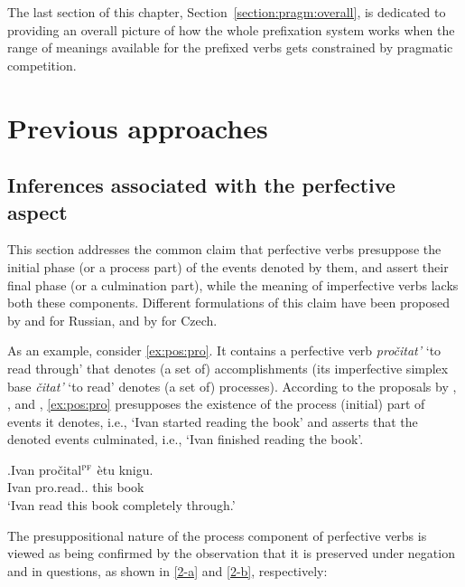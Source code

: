 The last section of this chapter, Section~\ref{section:pragm:overall}, is dedicated to providing an overall picture of how the whole prefixation system works when the range of meanings available for the prefixed verbs gets constrained by pragmatic competition. 

\section{Previous approaches}\label{sec:pragm:old}
\subsection{Inferences associated with the perfective aspect}\label{sec:pragm:old:perf}
This section addresses the common claim that perfective verbs presuppose the initial phase (or a process part) of the events denoted by them, and assert their final phase (or a culmination part), while the meaning of imperfective verbs lacks both these components. Different formulations of this claim have been proposed by \citet{Paducheva:96, Paducheva:11} and \citet{Romanova:06} for Russian, and by \citet{Docekal:09} for Czech.

As an example, consider \ref{ex:pos:pro}. It contains a perfective verb \textit{pro\v{c}itat'} `to read through' that denotes (a set of) accomplishments (its imperfective simplex base \textit{\v{c}itat'} `to read' denotes (a set of) processes). According to the proposals by \citet{Paducheva:96, Paducheva:11}, \citet{Romanova:06}, and \citet{Docekal:09}, \ref{ex:pos:pro} presupposes the existence of the process (initial) part of events it denotes, i.e., `Ivan started reading the book' and asserts that the denoted events culminated, i.e., `Ivan finished reading the book'.

\exg.\label{ex:pos:pro}Ivan pro\v{c}ital$^{\textsc{pf}}$ \`{e}tu knigu.\\
Ivan pro.read.. this book\\
\trans `Ivan read this book completely through.'

The presuppositional nature of the process component of perfective verbs is viewed as being confirmed by the observation that it is preserved under negation and in questions, as shown in \ref{2-a} and \ref{2-b}, respectively: 

